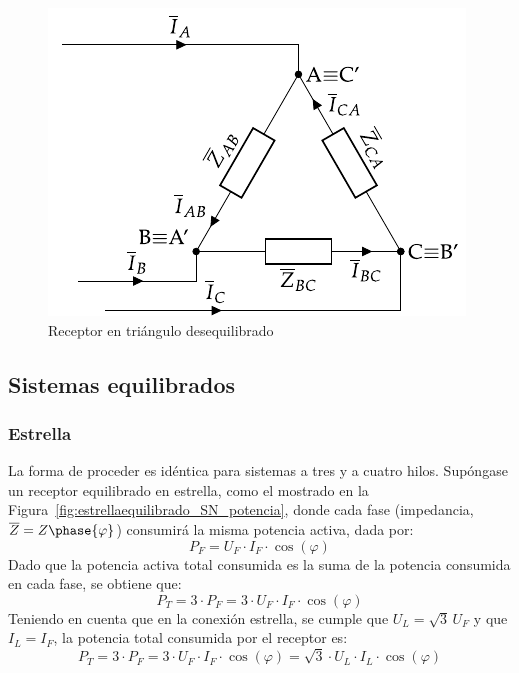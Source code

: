 	\begin{figure}
	    \centering
	    \includegraphics{../figs/trianguloDesequilibrado_receptor.pdf}
	    \caption{Receptor en triángulo desequilibrado}
	    \label{fig:trianguloDesequilibrado_receptor_potencia}
	\end{figure}
	
	\subsection{Sistemas equilibrados}
	
	\subsubsection{Estrella}
	
	La forma de proceder es idéntica para sistemas a tres y a cuatro hilos. Supóngase un receptor equilibrado en estrella, como el mostrado en la Figura~\ref{fig:estrellaequilibrado_SN_potencia}, donde cada fase (impedancia, $\overline{Z}=Z\phase{\varphi}$) consumirá la misma potencia activa, dada por: 
	\begin{equation*}
	    P_F=U_{F}\cdot I_F \cdot \cos(\varphi)
	\end{equation*}
	Dado que la potencia activa total consumida es la suma de la potencia consumida en cada fase, se obtiene que:
	\begin{equation*}
	    P_T=3\cdot P_F=3\cdot U_F\cdot I_F\cdot\cos(\varphi)
	\end{equation*}
	Teniendo en cuenta que en la conexión estrella, se cumple que $U_L=\sqrt{3}\,U_F$ y que $I_L=I_F$, la potencia total consumida por el receptor es: 
	\begin{equation}
	    \boxed{P_T=3\cdot P_F=3\cdot U_F\cdot {I_F}\cdot\cos(\varphi)=\sqrt{3}\cdot U_L\cdot I_L\cdot\cos(\varphi)}
	\end{equation}
	
